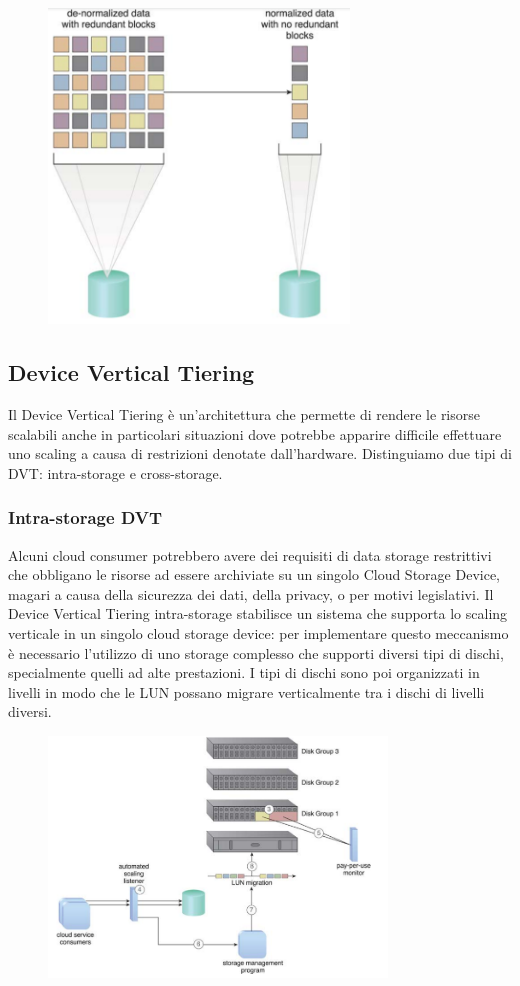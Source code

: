 \begin{figure}[htb!]
    \centering
    \includegraphics[width=8cm]{./Images/cap13/13.3.png}
\end{figure}

\subsection{Device Vertical Tiering}
Il Device Vertical Tiering è un'architettura che permette di rendere le risorse scalabili anche in particolari situazioni dove potrebbe apparire difficile effettuare uno scaling a causa di restrizioni denotate dall'hardware. Distinguiamo due tipi di DVT: intra-storage e cross-storage.

\subsubsection{Intra-storage DVT}
Alcuni cloud consumer potrebbero avere dei requisiti di data storage restrittivi che obbligano le risorse ad essere archiviate su un singolo Cloud Storage Device, magari a causa della sicurezza dei dati, della privacy, o per motivi legislativi. Il Device Vertical Tiering intra-storage stabilisce un sistema che supporta lo scaling verticale in un singolo cloud storage device: per implementare questo meccanismo è necessario l'utilizzo di uno storage complesso che supporti diversi tipi di dischi, specialmente quelli ad alte prestazioni. I tipi di dischi sono poi organizzati in livelli in modo che le LUN possano migrare verticalmente tra i dischi di livelli diversi.

\begin{figure}[htb!]
    \centering
    \includegraphics[width=9cm]{./Images/cap13/13.4.png}
\end{figure}

